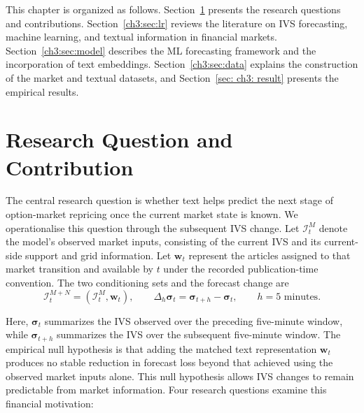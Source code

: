 This chapter is organized as follows. Section~\ref{ch3:sec:contribution} presents the research questions and contributions. Section~\ref{ch3:sec:lr} reviews the literature on IVS forecasting, machine learning, and textual information in financial markets. Section~\ref{ch3:sec:model} describes the ML forecasting framework and the incorporation of text embeddings. Section~\ref{ch3:sec:data} explains the construction of the market and textual datasets, and Section~\ref{sec: ch3: result} presents the empirical results.





\section{Research Question and Contribution}\label{ch3:sec:contribution}

The central research question is whether text helps predict the next stage of option-market repricing once the current market state is known. We operationalise this question through the subsequent IVS change. Let \(\mathcal I_t^{M}\) denote the model's observed market inputs, consisting of the current IVS and its current-side support and grid information. Let \(\mathbf w_t\) represent the articles assigned to that market transition and available by \(t\) under the recorded publication-time convention. The two conditioning sets and the forecast change are
\begin{equation}\label{eq:ch3:forecast_information_sets}
\mathcal{I}_t^{M+N}
=
\left(\mathcal{I}_t^{M},\mathbf{w}_t\right),
\qquad
\Delta_h\boldsymbol{\sigma}_t
=
\boldsymbol{\sigma}_{t+h}-\boldsymbol{\sigma}_t,
\qquad
h=5\text{ minutes}.
\end{equation}

Here, \(\boldsymbol{\sigma}_t\) summarizes the IVS observed over the preceding five-minute window, while \(\boldsymbol{\sigma}_{t+h}\) summarizes the IVS over the subsequent five-minute window. The empirical null hypothesis is that adding the matched text representation \(\mathbf{w}_t\) produces no stable reduction in forecast loss beyond that achieved using the observed market inputs alone. This null hypothesis allows IVS changes to remain predictable from market information. Four research questions examine this financial motivation:



